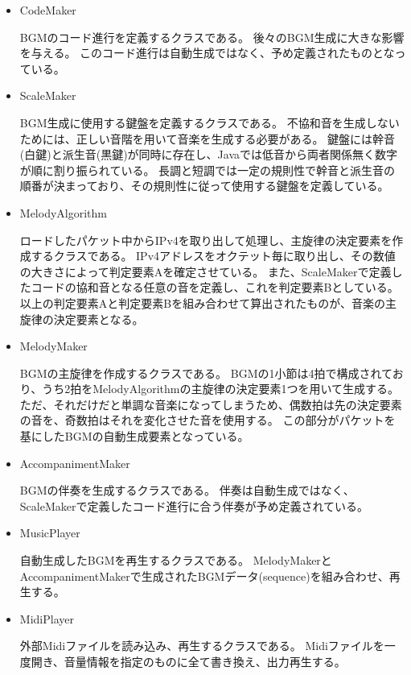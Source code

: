 \documentclass[11pt,a4paper]{jsarticle}
\begin{document}
\begin{itemize}
\item CodeMaker

 BGMのコード進行を定義するクラスである。
 後々のBGM生成に大きな影響を与える。
このコード進行は自動生成ではなく、予め定義されたものとなっている。


\item ScaleMaker

 BGM生成に使用する鍵盤を定義するクラスである。
 不協和音を生成しないためには、正しい音階を用いて音楽を生成する必要がある。
 鍵盤には幹音(白鍵)と派生音(黒鍵)が同時に存在し、Javaでは低音から両者関係無く数字が順に割り振られている。
 長調と短調では一定の規則性で幹音と派生音の順番が決まっており、その規則性に従って使用する鍵盤を定義している。


\item MelodyAlgorithm

ロードしたパケット中からIPv4を取り出して処理し、主旋律の決定要素を作成するクラスである。
IPv4アドレスをオクテット毎に取り出し、その数値の大きさによって判定要素Aを確定させている。
また、ScaleMakerで定義したコードの協和音となる任意の音を定義し、これを判定要素Bとしている。
 以上の判定要素Aと判定要素Bを組み合わせて算出されたものが、音楽の主旋律の決定要素となる。


\item MelodyMaker

 BGMの主旋律を作成するクラスである。
BGMの1小節は4拍で構成されており、うち2拍をMelodyAlgorithmの主旋律の決定要素1つを用いて生成する。
ただ、それだけだと単調な音楽になってしまうため、偶数拍は先の決定要素の音を、奇数拍はそれを変化させた音を使用する。
この部分がパケットを基にしたBGMの自動生成要素となっている。


\item AccompanimentMaker

 BGMの伴奏を生成するクラスである。
 伴奏は自動生成ではなく、ScaleMakerで定義したコード進行に合う伴奏が予め定義されている。


\item MusicPlayer

自動生成したBGMを再生するクラスである。
MelodyMakerとAccompanimentMakerで生成されたBGMデータ(sequence)を組み合わせ、再生する。


\item MidiPlayer

外部Midiファイルを読み込み、再生するクラスである。
Midiファイルを一度開き、音量情報を指定のものに全て書き換え、出力再生する。

\end{itemize}
\end{document}
